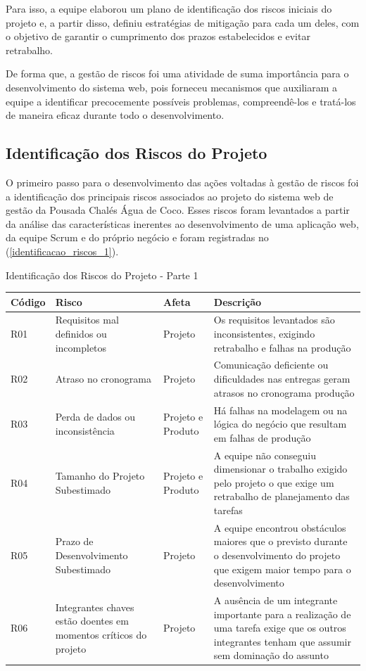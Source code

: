\documentclass[
	12pt,				%
	openany,			%
	oneside,			%
	a4paper,			%
	english,			%
	french,				%
	spanish,			%
	brazil				%
	]{abntex2}
\begin{document}
Para isso, a equipe elaborou um plano de identificação dos riscos iniciais do projeto e, a partir disso, definiu estratégias de mitigação para cada um deles, com o objetivo de garantir o cumprimento dos prazos estabelecidos e evitar retrabalho.

De forma que, a gestão de riscos foi uma atividade de suma importância para o desenvolvimento do sistema web, pois forneceu mecanismos que auxiliaram a equipe a identificar precocemente possíveis problemas, compreendê-los e tratá-los de maneira eficaz durante todo o desenvolvimento. 

\subsection{Identificação dos Riscos do Projeto}
O primeiro passo para o desenvolvimento das ações voltadas à gestão de riscos foi a identificação dos principais riscos associados ao projeto do sistema web de gestão da Pousada Chalés Água de Coco. Esses riscos foram levantados a partir da análise das características inerentes ao desenvolvimento de uma aplicação web, da equipe Scrum e do próprio negócio  e foram registradas no (\autoref{identificacao_riscos_1}).
\\
% 
\begin{quadro}[H]
	\caption{Identificação dos Riscos do Projeto - Parte 1} \label{identificacao_riscos_1} 
	\begin{tabular}{|>{\centering\arraybackslash}p{2cm}|>{\centering\arraybackslash}p{5cm}|>{\centering\arraybackslash}p{3cm}|p{4.2cm}|}
		\hline
		\textbf{Código} & \textbf{Risco} & \textbf{Afeta} & \textbf{Descrição}  \\
		\hline
		R01 & Requisitos mal definidos ou incompletos &
		Projeto  & Os requisitos levantados são inconsistentes, exigindo retrabalho e falhas na produção \\
		\hline
		R02 & Atraso no cronograma &
		Projeto  & Comunicação deficiente ou dificuldades nas entregas geram atrasos no cronograma produção \\
		\hline
		R03 & Perda de dados ou inconsistência &
		Projeto e \newline Produto  & Há falhas na modelagem ou na lógica do negócio que resultam em falhas de produção \\ \hline
		R04 & Tamanho do Projeto Subestimado &
		Projeto e Produto  & A equipe não conseguiu dimensionar o trabalho exigido pelo projeto o que exige um retrabalho de planejamento das tarefas \\
		\hline
		R05 & Prazo de Desenvolvimento Subestimado &
		Projeto & A equipe encontrou obstáculos maiores que o previsto durante o desenvolvimento do projeto que exigem maior tempo para o desenvolvimento \\
		\hline
		R06 & 	Integrantes chaves estão doentes em momentos críticos do projeto & Projeto & A ausência de um integrante importante para a realização de uma tarefa exige que os outros integrantes tenham que assumir sem dominação do assunto \\
		\hline
	\end{tabular}
\end{quadro}		
\end{document}
